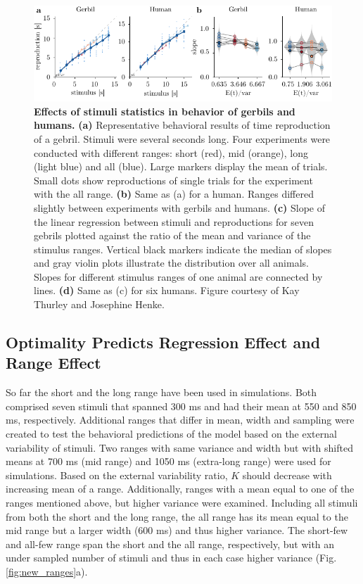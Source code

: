 \documentclass[10pt]{article}
\begin{document}
\begin{figure}[ht]
	\centering
	\includegraphics{figures/underestimation.pdf}
	\caption{\textbf{Effects of stimuli statistics in behavior of gerbils and humans.}
	\textbf{(a)} Representative behavioral results of time reproduction of a gebril. Stimuli were several seconds long. Four experiments were conducted with different ranges: short (red), mid (orange), long (light blue) and all (blue). Large markers display the mean of trials. Small dots show reproductions of single trials for the experiment with the all range.
	\textbf{(b)} Same as (a) for a human. Ranges differed slightly between experiments with gerbils and humans. 
	\textbf{(c)} Slope of the linear regression between stimuli and reproductions for seven gebrils plotted against the ratio of the mean and variance of the stimulus ranges. Vertical black markers indicate the median of slopes and gray violin plots illustrate the distribution over all animals. Slopes for different stimulus ranges of one animal are connected by lines. 
	\textbf{(d)} Same as (c) for six humans. 
	Figure courtesy of Kay Thurley and Josephine Henke.
	}
\label{fig:underestimation}
\end{figure}


\subsection{Optimality Predicts Regression Effect and Range Effect}
So far the short and the long range have been used in simulations. Both comprised seven stimuli that spanned 300 ms and had their mean at 550 and 850 ms, respectively. 
Additional ranges that differ in mean, width and sampling were created to test the behavioral predictions of the model based on the external variability of stimuli.  
Two ranges with same variance and width but with shifted means at 700 ms (mid range) and 1050 ms (extra-long range) were used for simulations. Based on the external variability ratio, $K$ should decrease with increasing mean of a range. 
Additionally, ranges with a mean equal to one of the ranges mentioned above, but higher variance were examined.
Including all stimuli from both the short and the long range, the all range has its mean equal to the mid range but a larger width (600 ms) and thus higher variance.
The short-few and all-few range span the short and the all range, respectively, but with an under sampled number of stimuli and thus in each case higher variance
(Fig. \ref{fig:new_ranges}a).
\end{document}
